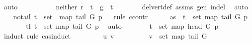 \begin{isabellebody}
\ auto\ \ \ \ \isanewline
\ \ \isamarkupfalse%
\isanewline
\ \ \isamarkupfalse%
\ neither{\isacharcolon}{\kern0pt}\ {\isachardoublequoteopen}r\ {\isasymnoteq}\ t\ {\isasymand}\ g\ {\isasymnoteq}\ t{\isachardoublequoteclose}\isanewline
\ \ \ \ \ \ \isamarkupfalse%
\ del{\isacharunderscore}{\kern0pt}vert{\isacharunderscore}{\kern0pt}def\ assms{\isacharparenleft}{\kern0pt}{}{\isacharparenright}{\kern0pt}\ gen\ in{\isacharunderscore}{\kern0pt}del\ \isamarkupfalse%
\ auto\isanewline
\ \ \isamarkupfalse%
\ no{\isacharunderscore}{\kern0pt}tail{\isacharcolon}{\kern0pt}\ {\isachardoublequoteopen}t\ {\isasymnotin}\ {\isacharparenleft}{\kern0pt}set\ {\isacharparenleft}{\kern0pt}\ map\ {\isacharparenleft}{\kern0pt}tail\ G{\isacharparenright}{\kern0pt}\ p{\isacharparenright}{\kern0pt}{\isacharparenright}{\kern0pt}{\isachardoublequoteclose}\isanewline
\ \ \isamarkupfalse%
{\isacharparenleft}{\kern0pt}rule\ ccontr{\isacharparenright}{\kern0pt}\isanewline
\ \ \ \ \isamarkupfalse%
\ as{}{\isacharcolon}{\kern0pt}\ {\isachardoublequoteopen}{\isasymnot}\ t\ {\isasymnotin}\ set\ {\isacharparenleft}{\kern0pt}map\ {\isacharparenleft}{\kern0pt}tail\ G{\isacharparenright}{\kern0pt}\ p{\isacharparenright}{\kern0pt}{\isachardoublequoteclose}\isanewline
\ \ \ \ \isamarkupfalse%
\ \isamarkupfalse%
\ tl{}{\isacharcolon}{\kern0pt}\ {\isachardoublequoteopen}t\ {\isasymin}\ set\ {\isacharparenleft}{\kern0pt}map\ {\isacharparenleft}{\kern0pt}tail\ G{\isacharparenright}{\kern0pt}\ p{\isacharparenright}{\kern0pt}{\isachardoublequoteclose}\ \isamarkupfalse%
\ auto\isanewline
\ \ \ \ \isamarkupfalse%
\ \isamarkupfalse%
\ {\isachardoublequoteopen}t\ {\isasymin}\ set\ {\isacharparenleft}{\kern0pt}map\ {\isacharparenleft}{\kern0pt}head\ G{\isacharparenright}{\kern0pt}\ p{\isacharparenright}{\kern0pt}{\isachardoublequoteclose}\isanewline
\ \ \ \ \isamarkupfalse%
\ {\isacharparenleft}{\kern0pt}induct\ rule{\isacharcolon}{\kern0pt}\ cas{\isachardot}{\kern0pt}induct{\isacharparenright}{\kern0pt}\isanewline
\ \ \ \ \ \ \isamarkupfalse%
\ {\isacharparenleft}{\kern0pt}{}\ u\ v{\isacharparenright}{\kern0pt}\isanewline
\ \ \ \ \ \ \isamarkupfalse%
\ \isamarkupfalse%
\ {\isachardoublequoteopen}v\ {\isasymnotin}\ set\ {\isacharparenleft}{\kern0pt}map\ {\isacharparenleft}{\kern0pt}tail\ G{\isacharparenright}{\kern0pt}\ {\isacharbrackleft}{\kern0pt}{\isacharbrackright}{\kern0pt}{\isacharparenright}{\kern0pt}{\isachardoublequoteclose}\ \isamarkupfalse%

\end{isabellebody}
